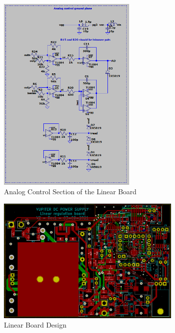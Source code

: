 \documentclass[15pt]{article}
\begin{document}
\begin{figure}[H]
    \centering
    \includegraphics[width=0.6\textwidth]{chase5}
    \caption{Analog Control Section of the Linear Board}
    \label{fig:chase5}
\end{figure}

\begin{figure}[H]
    \centering
    \includegraphics[width=0.8\textwidth]{chase6}
    \caption{Linear Board Design}
    \label{fig:chase6}
\end{figure}
\end{document}

